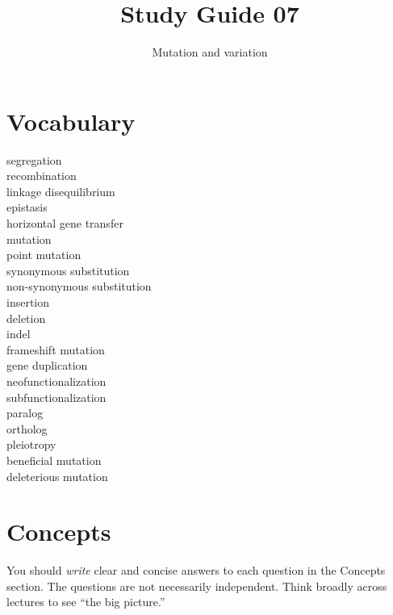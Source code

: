 \documentclass[letterpaper]{tufte-handout}
\title{Study Guide 07\hfill}
\author{Mutation and variation}
\date{} %
\begin{document}
\maketitle	%

\section{Vocabulary}

\begin{multicols}{2}
segregation \\
recombination \\
linkage disequilibrium \\
epistasis \\
horizontal gene transfer \\
mutation \\
point mutation \\
synonymous substitution \\
non-synonymous substitution \\
insertion \\
deletion \\
indel \\
frameshift mutation \\
gene duplication \\
neofunctionalization \\
subfunctionalization \\
paralog \\
ortholog \\
pleiotropy \\
beneficial mutation \\
deleterious mutation
\end{multicols}


\section{Concepts}

You should \emph{write} clear and concise answers to each question in the Concepts section.  The questions are not necessarily independent.  Think broadly across lectures to see ``the big picture.'' 
\end{document}

